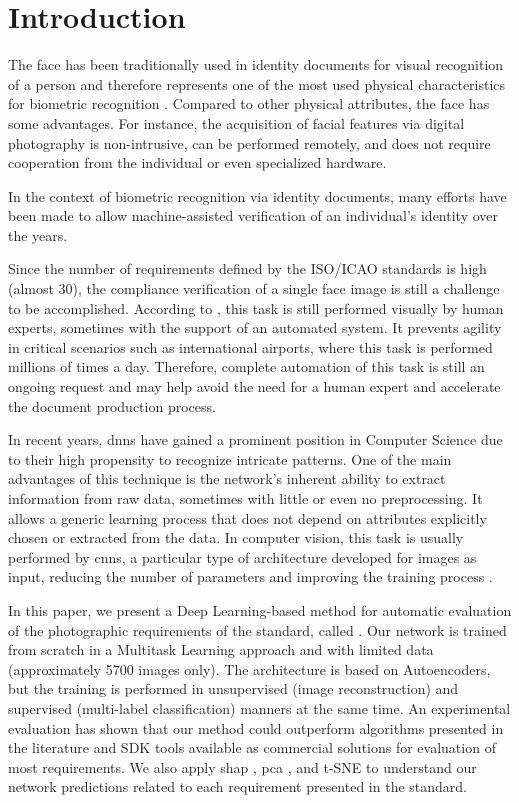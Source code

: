 \section{Introduction}

The face has been traditionally used in identity documents for visual recognition of a person and therefore represents one of the most used physical characteristics for biometric recognition \citep{ferrara2012face}. Compared to other physical attributes, the face has some advantages. For instance, the acquisition of facial features via digital photography is non-intrusive, can be performed remotely, and does not require cooperation from the individual or even specialized hardware.

In the context of biometric recognition via identity documents, many efforts have been made to allow machine-assisted verification of an individual's identity over the years. 



Since the number of requirements defined by the ISO/ICAO standards is high (almost 30), the compliance verification of a single face image is still a challenge to be accomplished. According to \cite{ferrara2012multi}, this task is still performed visually by human experts, sometimes with the support of an automated system. It prevents agility in critical scenarios such as international airports, where this task is performed millions of times a day. Therefore, complete automation of this task is still an ongoing request and may help avoid the need for a human expert and accelerate the document production process.

In recent years, \acfp{dnn} have gained a prominent position in Computer Science due to their high propensity to recognize intricate patterns. One of the main advantages of this technique is the network's inherent ability to extract information from raw data, sometimes with little or even no preprocessing. It allows a generic learning process that does not depend on attributes explicitly chosen or extracted from the data. In computer vision, this task is usually performed by \acfp{cnn}, a particular type of architecture developed for images as input, reducing the number of parameters and improving the training process \citep{goodfellow2016deep}.



In this paper, we present a Deep Learning-based method for automatic evaluation of the photographic requirements of the \icao standard, called \methodname. Our network is trained from scratch in a Multitask Learning approach and with limited data (approximately 5700 images only). The architecture is based on Autoencoders, but the training is performed in unsupervised (image reconstruction) and supervised (multi-label classification) manners at the same time. An experimental evaluation has shown that our method could outperform algorithms presented in the literature and SDK tools available as commercial solutions for evaluation of most requirements. We also apply \acf{shap} \citep{shap2018}, \acf{pca} \citep{pca}, and t-SNE \citep{tsne} to understand our network predictions related to each requirement presented in the \icao standard.

